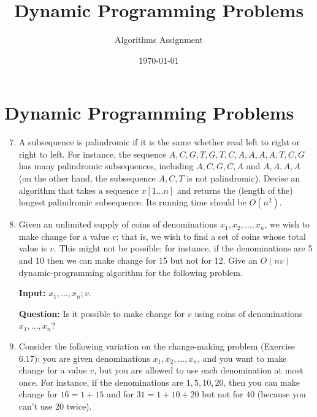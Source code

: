 \documentclass[12pt]{article}
\title{Dynamic Programming Problems}
\author{Algorithms Assignment}
\date{\today}
\begin{document}
\maketitle

\section*{Dynamic Programming Problems}

\begin{enumerate}[label=\textbf{6.\arabic*.}]
\setcounter{enumi}{6}

\item A subsequence is palindromic if it is the same whether read left to right or right to left. For
instance, the sequence
$A, C, G, T, G, T, C, A, A, A, A, T, C, G$
has many palindromic subsequences, including $A, C, G, C, A$ and $A, A, A, A$ (on the other hand,
the subsequence $A, C, T$ is not palindromic). Devise an algorithm that takes a sequence $x[1 \ldots n]$
and returns the (length of the) longest palindromic subsequence. Its running time should be
$O(n^2)$.

\setcounter{enumi}{16}

\item Given an unlimited supply of coins of denominations $x_1, x_2, \ldots, x_n$, we wish to make change for
a value $v$; that is, we wish to find a set of coins whose total value is $v$. This might not be possible:
for instance, if the denominations are 5 and 10 then we can make change for 15 but not for 12.
Give an $O(nv)$ dynamic-programming algorithm for the following problem.

\textbf{Input:} $x_1, \ldots, x_n; v$.

\textbf{Question:} Is it possible to make change for $v$ using coins of denominations $x_1, \ldots, x_n$?

\item Consider the following variation on the change-making problem (Exercise 6.17): you are given
denominations $x_1, x_2, \ldots, x_n$, and you want to make change for a value $v$, but you are allowed to
use each denomination at most once. For instance, if the denominations are $1, 5, 10, 20$, then you
can make change for $16 = 1 + 15$ and for $31 = 1 + 10 + 20$ but not for $40$ (because you can't use 20
twice).


\end{enumerate}
\end{document}
